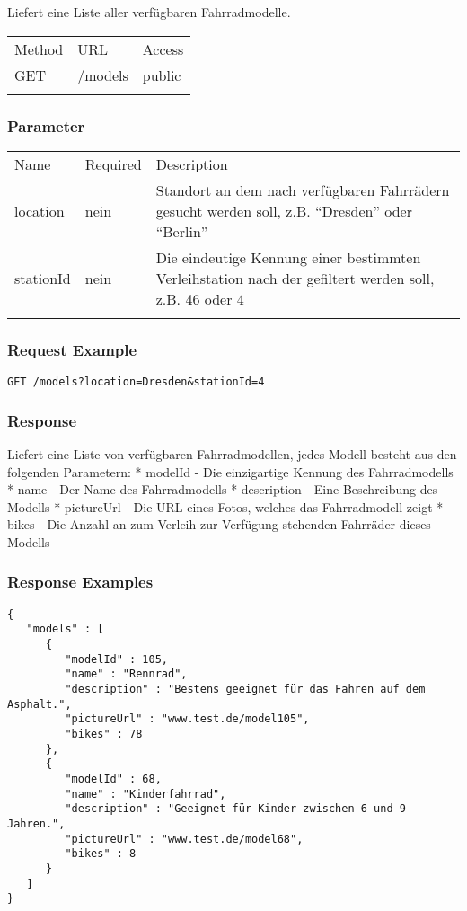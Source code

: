 Liefert eine Liste aller verfügbaren Fahrradmodelle.

\begin{longtable}[c]{@{}lll@{}}
\toprule\addlinespace
Method & URL & Access
\\\addlinespace
\midrule\endhead
GET & /models & public
\\\addlinespace
\bottomrule
\end{longtable}

\subsubsection{Parameter}\label{parameter}

\begin{longtable}[c]{@{}lll@{}}
\toprule\addlinespace
Name & Required & Description
\\\addlinespace
\midrule\endhead
location & nein & Standort an dem nach verfügbaren Fahrrädern gesucht
werden soll, z.B. ``Dresden'' oder ``Berlin''
\\\addlinespace
stationId & nein & Die eindeutige Kennung einer bestimmten
Verleihstation nach der gefiltert werden soll, z.B. 46 oder 4
\\\addlinespace
\bottomrule
\end{longtable}

\subsubsection{Request Example}\label{request-example}

\begin{verbatim}
GET /models?location=Dresden&stationId=4
\end{verbatim}

\subsubsection{Response}\label{response}

Liefert eine Liste von verfügbaren Fahrradmodellen, jedes Modell besteht
aus den folgenden Parametern: * modelId - Die einzigartige Kennung des
Fahrradmodells * name - Der Name des Fahrradmodells * description - Eine
Beschreibung des Modells * pictureUrl - Die URL eines Fotos, welches das
Fahrradmodell zeigt * bikes - Die Anzahl an zum Verleih zur Verfügung
stehenden Fahrräder dieses Modells

\subsubsection{Response Examples}\label{response-examples}

\begin{verbatim}
{
   "models" : [
      {
         "modelId" : 105,
         "name" : "Rennrad",
         "description" : "Bestens geeignet für das Fahren auf dem Asphalt.",
         "pictureUrl" : "www.test.de/model105",
         "bikes" : 78
      },
      {
         "modelId" : 68,
         "name" : "Kinderfahrrad",
         "description" : "Geeignet für Kinder zwischen 6 und 9 Jahren.",
         "pictureUrl" : "www.test.de/model68",
         "bikes" : 8
      }
   ]
}
\end{verbatim}
